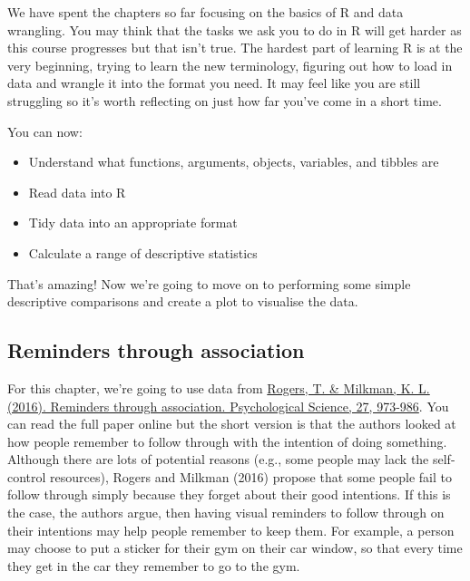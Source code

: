 \documentclass[]{book}
\providecommand{\tightlist}{%
  \setlength{\itemsep}{0pt}\setlength{\parskip}{0pt}}
\begin{document}
We have spent the chapters so far focusing on the basics of R and data wrangling. You may think that the tasks we ask you to do in R will get harder as this course progresses but that isn't true. The hardest part of learning R is at the very beginning, trying to learn the new terminology, figuring out how to load in data and wrangle it into the format you need. It may feel like you are still struggling so it's worth reflecting on just how far you've come in a short time.

You can now:

\begin{itemize}
\tightlist
\item
  Understand what functions, arguments, objects, variables, and tibbles are\\
\item
  Read data into R\\
\item
  Tidy data into an appropriate format\\
\item
  Calculate a range of descriptive statistics
\end{itemize}

That's amazing! Now we're going to move on to performing some simple descriptive comparisons and create a plot to visualise the data.

\hypertarget{reminders-through-association}{%
\subsection{Reminders through association}\label{reminders-through-association}}

For this chapter, we're going to use data from \href{https://journals.sagepub.com/stoken/default+domain/6XgDSfr6ZHSDs47tx5bu/full}{Rogers, T. \& Milkman, K. L. (2016). Reminders through association. Psychological Science, 27, 973-986}. You can read the full paper online but the short version is that the authors looked at how people remember to follow through with the intention of doing something. Although there are lots of potential reasons (e.g., some people may lack the self-control resources), Rogers and Milkman (2016) propose that some people fail to follow through simply because they forget about their good intentions. If this is the case, the authors argue, then having visual reminders to follow through on their intentions may help people remember to keep them. For example, a person may choose to put a sticker for their gym on their car window, so that every time they get in the car they remember to go to the gym.
\end{document}
